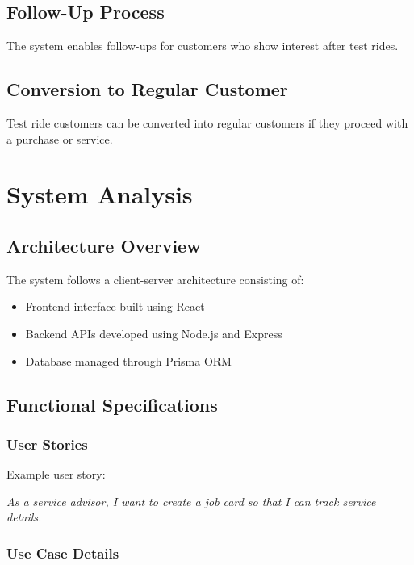 \documentclass[12pt,a4paper]{report}
\begin{document}
\section{Follow-Up Process}

The system enables follow-ups for customers who show interest after test rides.

\section{Conversion to Regular Customer}

Test ride customers can be converted into regular customers if they proceed with a purchase or service.

\chapter{System Analysis}

\section{Architecture Overview}

The system follows a client-server architecture consisting of:

\begin{itemize}
\item Frontend interface built using React
\item Backend APIs developed using Node.js and Express
\item Database managed through Prisma ORM
\end{itemize}

\section{Functional Specifications}

\subsection{User Stories}

Example user story:

\textit{As a service advisor, I want to create a job card so that I can track service details.}

\subsection{Use Case Details}
\end{document}
